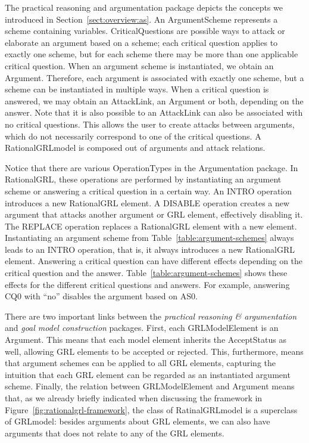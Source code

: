 The practical reasoning and argumentation package depicts the concepts we introduced in Section~\ref{sect:overview:as}. An \textsf{ArgumentScheme} represents a scheme containing variables. \textsf{CriticalQuestions} are possible ways to attack or elaborate an argument based on a scheme; each critical question applies to exactly one scheme, but for each scheme there may be more than one applicable critical question. When an argument scheme is instantiated, we obtain an \textsf{Argument}. Therefore, each argument is associated with exactly one scheme, but a scheme can be instantiated in multiple ways. When a critical question is answered, we may obtain an \textsf{AttackLink}, an \textsf{Argument} or both, depending on the answer. Note that it is also possible to an \textsf{AttackLink} can also be associated with no critical questions. This allows the user to create attacks between arguments, which do not necessarily correspond to one of the critical questions. A \textsf{RationalGRLmodel} is composed out of arguments and attack relations.

Notice that there are various \textsf{OperationTypes} in the Argumentation package. In RationalGRL, these operations are performed by instantiating an argument scheme or answering a critical question in a certain way. An \textsf{INTRO} operation introduces a new RationalGRL element. A \textsf{DISABLE} operation creates a new argument that attacks another argument or GRL element, effectively disabling it. The \textsf{REPLACE} operation replaces a RationalGRL element with a new element. Instantiating an argument scheme from Table~\ref{table:argument-schemes} always leads to an \textsf{INTRO} operation, that is, it always introduces a new RationalGRL element. Answering a critical question can have different effects depending on the critical question and the answer. Table~\ref{table:argument-schemes} shows these effects for the different critical questions and answers. For example, answering CQ0 with ``no'' disables the argument based on AS0. 

There are two important links between the \emph{practical reasoning \& argumentation} and \emph{goal model construction} packages. First, each \textsf{GRLModelElement} is an \textsf{Argument}. This means that each model element inherits the \textsf{AcceptStatus} as well, allowing GRL elements to be accepted or rejected. This, furthermore, means that argument schemes can be applied to all GRL elements, capturing the intuition that each GRL element can be regarded as an instantiated argument scheme. Finally, the relation between \textsf{GRLModelElement} and \textsf{Argument} means that, as we already briefly indicated when discussing the framework in Figure~\ref{fig:rationalgrl-framework}, the class of \textsf{RatinalGRLmodel} is a superclass of \textsf{GRLmodel}: besides arguments about GRL elements, we can also have arguments that does not relate to any of the GRL elements.

